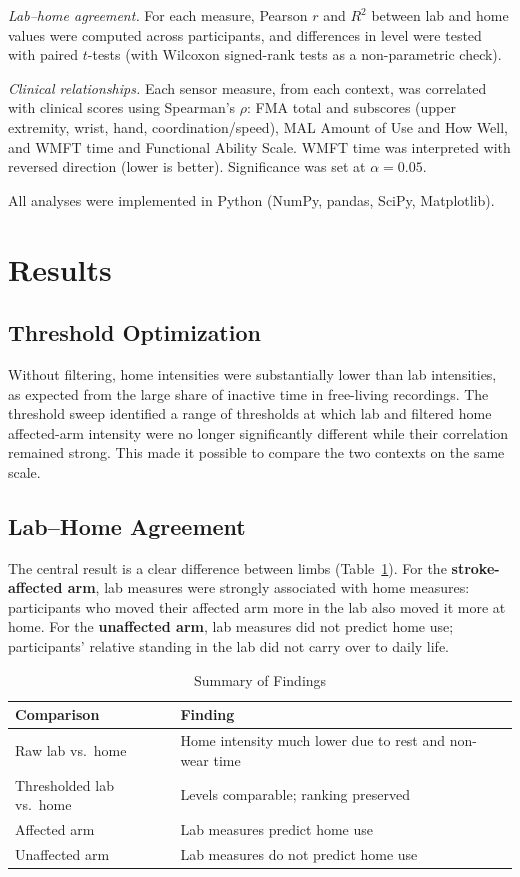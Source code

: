 \documentclass[conference]{IEEEtran}
\begin{document}
\emph{Lab–home agreement.} For each measure, Pearson $r$ and $R^2$ between lab and
home values were computed across participants, and differences in level were
tested with paired $t$-tests (with Wilcoxon signed-rank tests as a
non-parametric check).

\emph{Clinical relationships.} Each sensor measure, from each context, was
correlated with clinical scores using Spearman's $\rho$: FMA total and subscores
(upper extremity, wrist, hand, coordination/speed), MAL Amount of Use and How
Well, and WMFT time and Functional Ability Scale. WMFT time was interpreted with
reversed direction (lower is better). Significance was set at $\alpha = 0.05$.

All analyses were implemented in Python (NumPy, pandas, SciPy, Matplotlib).

\section{Results}

\subsection{Threshold Optimization}

Without filtering, home intensities were substantially lower than lab intensities,
as expected from the large share of inactive time in free-living recordings. The
threshold sweep identified a range of thresholds at which lab and filtered home
affected-arm intensity were no longer significantly different while their
correlation remained strong. This made it possible to compare the two contexts on
the same scale.

\subsection{Lab–Home Agreement}

The central result is a clear difference between limbs
(Table~\ref{tab:summary}). For the \textbf{stroke-affected arm}, lab measures were
strongly associated with home measures: participants who moved their affected arm
more in the lab also moved it more at home. For the \textbf{unaffected arm}, lab
measures did not predict home use; participants' relative standing in the lab
did not carry over to daily life.

\begin{table}[t]
\caption{Summary of Findings}
\label{tab:summary}
\centering
\footnotesize
\begin{tabular}{@{}p{2.3cm}p{5.4cm}@{}}
\toprule
Comparison & Finding \\
\midrule
Raw lab vs.\ home & Home intensity much lower due to rest and non-wear time \\
Thresholded lab vs.\ home & Levels comparable; ranking preserved \\
Affected arm & Lab measures predict home use \\
Unaffected arm & Lab measures do not predict home use \\
\bottomrule
\end{tabular}
\end{table}
\end{document}
